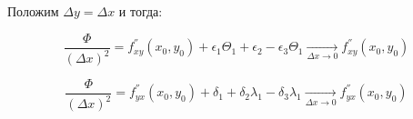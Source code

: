 Положим $\Delta y = \Delta x$ и тогда:

$$
\frac{\Phi}{(\Delta x)^2} = f_{x y}^{''}(x_0, y_0) + \epsilon_1\Theta_1 + \epsilon_2  - \epsilon_3\Theta_1\underset{\Delta x \to 0}{\longrightarrow} f_{x y}^{''}(x_0, y_0)
$$ 

$$
\frac{\Phi}{(\Delta x)^2} = f_{y x}^{''}(x_0, y_0) + \delta_1 + \delta_2\lambda_1 - \delta_3\lambda_1 \underset{\Delta x \to 0}{\longrightarrow} f_{y x}^{''}(x_0, y_0)
$$
